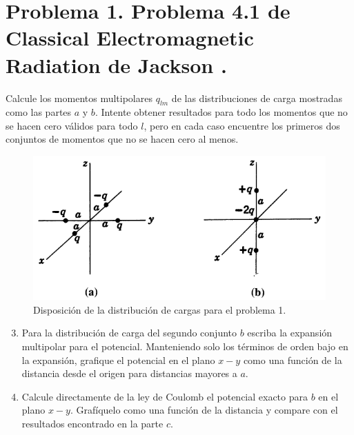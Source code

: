 \documentclass[a4paper,11pt]{article}
\numberwithin{equation}{section}
\renewcommand{\thefootnote}{\fnsymbol{footnote}}
\begin{document}

\fancyhead[R]{\thepage}

\setcounter{footnote}{0}
\renewcommand*{\thefootnote}{\arabic{footnote}}

\section{Problema 1. Problema 4.1 de Classical Electromagnetic Radiation
de Jackson \cite{jackson}.}

Calcule los momentos multipolares $q_{lm}$ de las distribuciones de carga mostradas 
como las partes $a$ y $b$. Intente obtener resultados para todo los momentos que 
no se hacen cero válidos para todo $l$, pero en cada caso encuentre los primeros 
dos conjuntos de momentos que no se hacen cero al menos.

\begin{figure}[H]
 \center 
 \includegraphics[scale = 0.5]{problema1fig1}
 \caption{Disposición de la distribución de cargas para el problema 1.}
\end{figure}

\begin{enumerate}[label=\textbf{(\alph*)}]
\setcounter{enumi}{2}
\item Para la distribución de carga del segundo conjunto $b$ escriba la expansión 
multipolar para el potencial. Manteniendo solo los términos de orden bajo en la 
expansión, grafique el potencial en el plano $x-y$ como una función de la distancia 
desde el origen para distancias mayores a $a$.
\item Calcule directamente de la ley de Coulomb el potencial exacto para $b$ en 
el plano $x-y$. Grafíquelo como una función de la distancia y compare con el resultados
encontrado en la parte $c$.
\end{enumerate}
\end{document}
